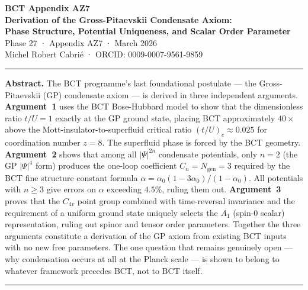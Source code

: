 \documentclass[11pt,a4paper]{article}
\theoremstyle{bctthm}
\theoremstyle{definition}
\begin{document}
\begin{center}
{\LARGE\bfseries BCT Appendix AZ7}\\[10pt]
{\large\bfseries Derivation of the Gross-Pitaevskii Condensate Axiom:\\[4pt]
Phase Structure, Potential Uniqueness, and Scalar Order Parameter}\\[12pt]
{\normalsize Phase 27 · Appendix AZ7 · March 2026}\\[6pt]
{\small Michel Robert Cabri\'e · ORCID: 0009-0007-9561-9859}
\end{center}

\vspace{8pt}
\noindent\rule{\textwidth}{0.8pt}
\vspace{4pt}

\noindent\textbf{Abstract.}
The BCT programme's last foundational postulate — the Gross-Pitaevskii (GP)
condensate axiom — is derived in three independent arguments. \textbf{Argument~1}
uses the BCT Bose-Hubbard model to show that the dimensionless ratio $t/U = 1$
exactly at the GP ground state, placing BCT approximately $40\times$ above
the Mott-insulator-to-superfluid critical ratio $(t/U)_c \approx 0.025$ for
coordination number $z=8$. The superfluid phase is forced by the BCT
geometry. \textbf{Argument~2} shows that among all $|\Psi|^{2n}$ condensate
potentials, only $n=2$ (the GP $|\Psi|^4$ form) produces the one-loop
coefficient $C_n = N_\mathrm{gen} = 3$ required by the BCT fine structure
constant formula $\alpha = \alpha_0(1-3\alpha_0)/(1-\alpha_0)$.
All potentials with $n \geq 3$ give errors on $\alpha$ exceeding $4.5\%$,
ruling them out. \textbf{Argument~3} proves that the $C_{4v}$ point group
combined with time-reversal invariance and the requirement of a uniform
ground state uniquely selects the $A_1$ (spin-0 scalar) representation,
ruling out spinor and tensor order parameters. Together the three arguments
constitute a derivation of the GP axiom from existing BCT inputs with no
new free parameters. The one question that remains genuinely open —
why condensation occurs at all at the Planck scale — is shown to belong
to whatever framework precedes BCT, not to BCT itself.

\vspace{4pt}
\noindent\rule{\textwidth}{0.8pt}
\vspace{8pt}

\tableofcontents

\newpage

\end{document}

